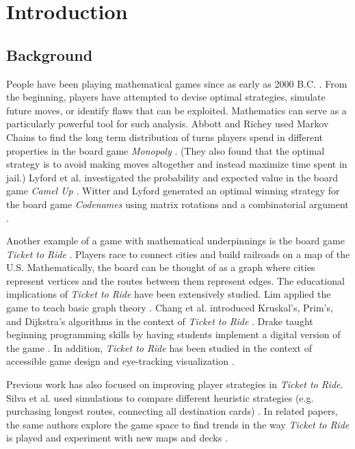 \section{Introduction}
\subsection{Background}
People have been playing mathematical games
since as early as 2000 B.C.
\cite{cornelius1986historical}.
From the beginning,
players have attempted to devise optimal
strategies, simulate future moves, or identify
flaws that can be exploited.
Mathematics can serve as a particularly powerful tool for
such analysis.
Abbott and Richey used Markov Chains
to find the long term 
distribution of turns players spend in different
properties in the board game
\textit{Monopoly} \cite{abbott1997take, magie1935}.
(They also found that the optimal strategy is to avoid making
moves altogether and instead maximize time spent in jail.)
Lyford et al. investigated the probability and expected value 
in the board game \textit{Camel Up}
\cite{bogen2014, lyford2019using}.
Witter and Lyford generated an optimal winning strategy for the 
board game \textit{Codenames} using matrix rotations
and a combinatorial argument \cite{chvatil2015}.

Another example of a game with mathematical underpinnings is
the board game \textit{Ticket to Ride} \cite{moon2004ticket}. 
Players race to connect 
cities and build railroads on a map of the U.S.
Mathematically, the board
can be thought of as a graph where
cities represent vertices and the
routes between them represent edges.
The educational implications of \textit{Ticket to Ride}
have been extensively studied.
Lim applied the game to teach basic graph theory
\cite{lim2007taking}.
Chang et al. introduced Kruskal's, Prim's, and Dijkstra's
algorithms in the context of \textit{Ticket to Ride}
\cite{chang2008learning}.
Drake taught beginning programming skills by having
students implement a digital version of the game \cite{drake2011teaching}.
In addition, \textit{Ticket to Ride} has been studied in the context of
accessible game design and eye-tracking visualization
\cite{eriksson2005enhancing, newn2017evaluating}.

Previous work has also focused on improving player 
strategies in \textit{Ticket to Ride}.
Silva et al. used simulations to compare different
heuristic strategies (e.g. purchasing longest routes,
connecting all destination cards) \cite{de2017playtesting}.
In related papers, the same authors explore the 
game space to find trends in the way \textit{Ticket to Ride}
is played and experiment with new maps and decks 
\cite{de2017evaluator, de2018evolving}.

